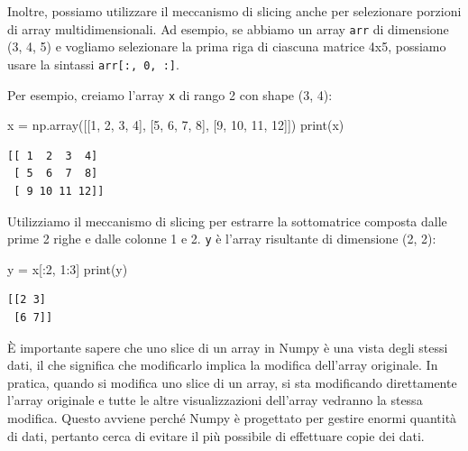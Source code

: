 \documentclass[
  letterpaper,
  krantz2]{{[}./krantz{]}}
\newenvironment{Shaded}{\begin{snugshade}}{\end{snugshade}}
\newcommand{\BuiltInTok}[1]{\textcolor[rgb]{0.00,0.23,0.31}{#1}}
\newcommand{\DecValTok}[1]{\textcolor[rgb]{0.68,0.00,0.00}{#1}}
\newcommand{\NormalTok}[1]{\textcolor[rgb]{0.00,0.23,0.31}{#1}}
\newcommand{\OperatorTok}[1]{\textcolor[rgb]{0.37,0.37,0.37}{#1}}
\begin{document}
Inoltre, possiamo utilizzare il meccanismo di slicing anche per
selezionare porzioni di array multidimensionali. Ad esempio, se abbiamo
un array \texttt{arr} di dimensione (3, 4, 5) e vogliamo selezionare la
prima riga di ciascuna matrice 4x5, possiamo usare la sintassi
\texttt{arr{[}:,\ 0,\ :{]}}.

Per esempio, creiamo l'array \texttt{x} di rango 2 con shape (3, 4):

\begin{Shaded}
\begin{Highlighting}[]
\NormalTok{x }\OperatorTok{=}\NormalTok{ np.array([[}\DecValTok{1}\NormalTok{, }\DecValTok{2}\NormalTok{, }\DecValTok{3}\NormalTok{, }\DecValTok{4}\NormalTok{], [}\DecValTok{5}\NormalTok{, }\DecValTok{6}\NormalTok{, }\DecValTok{7}\NormalTok{, }\DecValTok{8}\NormalTok{], [}\DecValTok{9}\NormalTok{, }\DecValTok{10}\NormalTok{, }\DecValTok{11}\NormalTok{, }\DecValTok{12}\NormalTok{]])}
\BuiltInTok{print}\NormalTok{(x)}
\end{Highlighting}
\end{Shaded}

\begin{verbatim}
[[ 1  2  3  4]
 [ 5  6  7  8]
 [ 9 10 11 12]]
\end{verbatim}

Utilizziamo il meccanismo di slicing per estrarre la sottomatrice
composta dalle prime 2 righe e dalle colonne 1 e 2. \texttt{y} è l'array
risultante di dimensione (2, 2):

\begin{Shaded}
\begin{Highlighting}[]
\NormalTok{y }\OperatorTok{=}\NormalTok{ x[:}\DecValTok{2}\NormalTok{, }\DecValTok{1}\NormalTok{:}\DecValTok{3}\NormalTok{]}
\BuiltInTok{print}\NormalTok{(y)}
\end{Highlighting}
\end{Shaded}

\begin{verbatim}
[[2 3]
 [6 7]]
\end{verbatim}

È importante sapere che uno slice di un array in Numpy è una vista degli
stessi dati, il che significa che modificarlo implica la modifica
dell'array originale. In pratica, quando si modifica uno slice di un
array, si sta modificando direttamente l'array originale e tutte le
altre visualizzazioni dell'array vedranno la stessa modifica. Questo
avviene perché Numpy è progettato per gestire enormi quantità di dati,
pertanto cerca di evitare il più possibile di effettuare copie dei dati.
\end{document}
